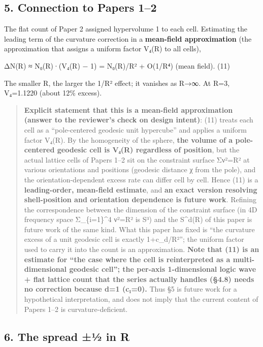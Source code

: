 \documentclass[
]{ltjsarticle}
\begin{document}
\subsection{5. Connection to Papers 1--2}\label{connection-to-papers-12}

The flat count of Paper 2 assigned hypervolume 1 to each cell.
Estimating the leading term of the curvature correction in a
\textbf{mean-field approximation} (the approximation that assigns a
uniform factor V₄(R) to all cells),

ΔN(R) ≈ N₀(R)·(V₄(R) − 1) = N₀(R)/R² + O(1/R⁴) (mean field). (11)

The smaller R, the larger the 1/R² effect; it vanishes as R→∞. At R=3,
V₄=1.1220 (about 12\% excess).

\begin{quote}
\textbf{Explicit statement that this is a mean-field approximation
(answer to the reviewer's check on design intent)}: (11) treats each
cell as a ``pole-centered geodesic unit hypercube'' and applies a
uniform factor V₄(R). By the homogeneity of the sphere, \textbf{the
volume of a pole-centered geodesic cell is V₄(R) regardless of
position}, but the actual lattice cells of Papers 1--2 sit on the
constraint surface Σν²=R² at various orientations and positions
(geodesic distance χ from the pole), and the orientation-dependent
excess rate can differ cell by cell. Hence (11) is a
\textbf{leading-order, mean-field estimate}, and \textbf{an exact
version resolving shell-position and orientation dependence is future
work}. Refining the correspondence between the dimension of the
constraint surface (in 4D frequency space Σ\_\{i=1\}\^{}4 ν²=R² is S³)
and the S\^{}d(R) of this paper is future work of the same kind. What
this paper has fixed is ``the curvature excess of a unit geodesic cell
is exactly 1+c\_d/R²''; the uniform factor used to carry it into the
count is an approximation. \textbf{Note that (11) is an estimate for
``the case where the cell is reinterpreted as a multi-dimensional
geodesic cell''; the per-axis 1-dimensional logic wave + flat lattice
count that the series actually handles (§4.8) needs no correction
because d=1 (c₁=0).} Thus §5 is future work for a hypothetical
interpretation, and does not imply that the current content of Papers
1--2 is curvature-deficient.
\end{quote}

\subsection{6. The spread ±½ in R}\label{the-spread-uxbd-in-r}
\end{document}
